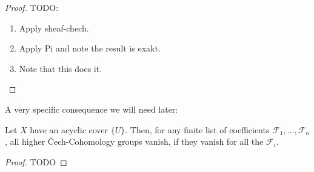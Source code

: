 \begin{proof}
  TODO:
  \begin{enumerate}
  \item Apply sheaf-chech.
  \item Apply Pi and note the result is exakt.
  \item Note that this does it.
  \end{enumerate}
\end{proof}

A very specific consequence we will need later:

\begin{corollary}%
  \label{chech-coefficient-sum}
  Let $X$ have an acyclic cover $\{U\}$.
  Then, for any finite list of coefficients $\mathcal F_1,\dots,\mathcal F_n$,
  all higher \v{C}ech-Cohomology groups vanish, if they vanish for all the $\mathcal F_i$.
\end{corollary}

\begin{proof}
  TODO
\end{proof}